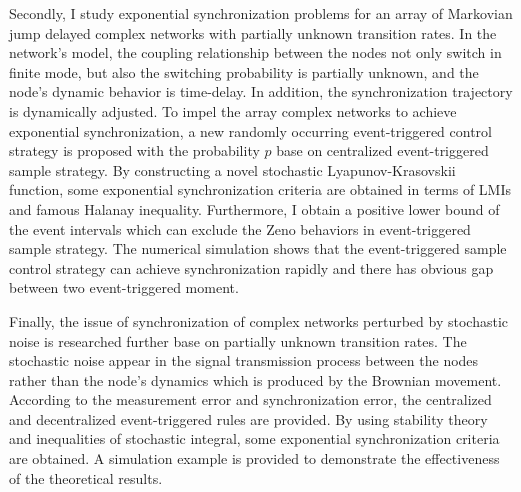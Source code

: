 \begin{englishabstract}
Secondly, I study exponential synchronization problems for an array of Markovian jump delayed complex networks with partially unknown transition rates. In the network's model, the coupling relationship between the nodes not only switch in finite mode, but also the switching probability is partially unknown, and the node's dynamic behavior is time-delay. In addition, the synchronization trajectory is dynamically adjusted. To impel the array complex networks to achieve exponential synchronization, a new randomly occurring event-triggered control strategy is proposed with the probability $p$ base on centralized event-triggered sample strategy. By constructing a novel stochastic Lyapunov-Krasovskii function, some exponential synchronization criteria are obtained in terms of LMIs and famous Halanay inequality. Furthermore, I obtain a positive lower bound of the event intervals which can exclude the Zeno behaviors in event-triggered sample strategy. The numerical simulation shows that the event-triggered sample control strategy can achieve synchronization rapidly and there has obvious gap between two event-triggered moment.

Finally, the issue of synchronization of complex networks perturbed by stochastic noise is researched further base on partially unknown transition rates. The stochastic noise appear in the signal transmission process between the nodes rather than the node's dynamics which is produced by the Brownian movement. According to the measurement error and synchronization error, the centralized and decentralized event-triggered rules are provided. By using stability theory and inequalities of stochastic integral, some exponential synchronization criteria are obtained. A simulation example is provided to demonstrate the effectiveness of the theoretical results.

\vspace{4ex}
\end{englishabstract}
